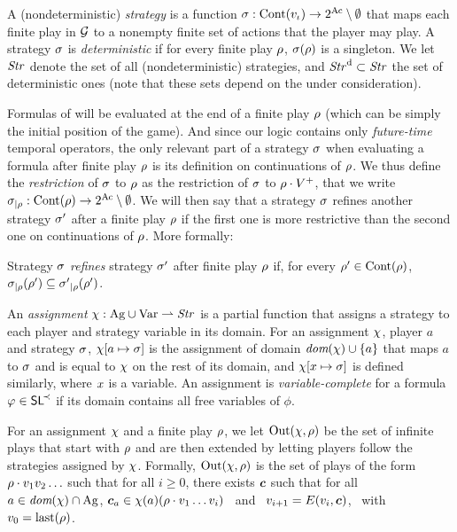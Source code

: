 \halfline {} A (nondeterministic) \emph{strategy} is a
function
$\sigma:\text{Cont}(v_{\iota})\to 2^{\textnormal{Ac}}\setminus\emptyset$
that maps each finite play in $\CGS$ to a nonempty finite set of
actions that the player may play.  A strategy $\sigma$ is
\emph{deterministic} if for every finite play $\rho$,
$\sigma(\rho)$ is a singleton.  We let $\mbox{\emph{Str}}$ denote the set of
all (nondeterministic) strategies, and $\mbox{\emph{Str}}^{\text{d}}\subset\mbox{\emph{Str}}$
the set of deterministic ones (note that these sets depend on the \CGS
under consideration).

Formulas of \SLref will be evaluated at the end of a finite play
$\rho$ (which can be simply the initial position of the game). And
since our logic contains only \emph{future-time} temporal operators,
the only relevant part of a strategy $\sigma$ when evaluating  a
formula after finite play $\rho$ is its definition on continuations
of $\rho$. We thus define the \emph{restriction} of $\sigma$ to
$\rho$ as the restriction of $\sigma$ to $\rho\cdot V^+$, that we
write ${\sigma}_{|\rho}:\text{Cont}(\rho)\to 2^{\textnormal{Ac}}\setminus\emptyset$.
We will then say that a strategy $\sigma$ refines another strategy
$\sigma'$ after a finite play $\rho$ if the first one is more
restrictive than the second one on continuations of $\rho$. More formally:

\begin{definition}
  Strategy $\sigma$ \emph{refines} strategy $\sigma'$  after finite
  play $\rho$ if, for every  $\rho'\in\text{Cont}(\rho)$, ${\sigma}_{|\rho}(\rho')\subseteq {\sigma'}_{|\rho}(\rho')$.
\end{definition}

An \emph{assignment}  $\chi:\textnormal{Ag}\cup\textnormal{Var} \rightharpoonup \mbox{\emph{Str}}$
is a partial function that assigns a strategy  to
each  player and strategy variable in its domain.
For an assignment
$\chi$, player $a$ and  strategy $\sigma$,
$\chi[a\mapsto\sigma]$ is the assignment of domain
$\textit{dom}(\chi)\cup\{a\}$ that maps $a$ to $\sigma$ and is equal to
$\chi$ on the rest of its domain, and 
$\chi[x\mapsto \sigma]$ is defined similarly, where $x$ is a
variable. %
An assignment is
\emph{variable-complete} for a formula $\varphi\in\textnormal{{\sffamily SL}}^{\!\prec}$ if
its domain contains all free variables of $\phi$.

For an assignment $\chi$ and a finite play $\rho$, we let
$\textnormal{Out}(\chi,\rho)$ be the set of infinite plays that start with
$\rho$ and are then extended by letting players follow the strategies
assigned by $\chi$. Formally,
 $\textnormal{Out}(\chi,\rho)$ is the set of plays of the form $\rho \cdot
 v_{1}v_{2}\ldots$ such that for all $i\geq 0$, there exists
 $\bm{c}$ such that for all $a\in\textit{dom}(\chi)\cap\textnormal{Ag}$,
 $\bm{c}_a\in\chi(a)(\rho\cdot v_{1}\ldots v_i)$ \mbox{ and }
 $v_{i+1}=E(v_{i},\bm{c})$, \mbox{ with }
 $v_{0}=\mbox{last}(\rho)$.
 

